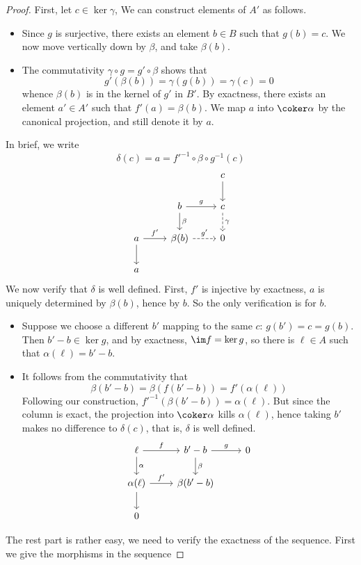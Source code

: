 \begin{proof}
First, let $c\in\ker\gamma$, We can construct elements of $A'$ as follows. 
\begin{itemize}
\item Since $g$ is surjective, there exists an element $b\in B$ such that $g(b)=c$. We now move vertically down by $\beta$, and take $\beta(b)$.
\item The commutativity $\gamma\circ g=g'\circ\beta$ shows that 
\[g'(\beta(b))=\gamma(g(b))=\gamma(c)=0\]
whence $\beta(b)$ is in the kernel of $g'$ in $B'$. By exactness, there exists an element $a'\in A'$ such that $f'(a)=\beta(b)$. We map $a$ into $\coker\alpha$ by the canonical projection, and still denote it by $a$.
\end{itemize}
In brief, we write
\[\delta(c)=a=f'^{-1}\circ\beta\circ g^{-1}(c)\]
\[\begin{tikzcd}
&&c\ar[d]\\
&b\ar[d,"\beta"]\ar[r,"g"]&c\ar[d,dashed,"\gamma"]\\
a\ar[d]\ar[r,"f'"]&\beta(b)\ar[r,dashed,"g'"]&0\\
a&&
\end{tikzcd}\]
\newline
We now verify that $\delta$ is well defined. First, $f'$ is injective by exactness, $a$ is uniquely determined by $\beta(b)$, hence by $b$. So the only verification is for $b$.\par
\begin{itemize}
\item Suppose we choose a different $b'$ mapping to the same $c$: $g(b')=c=g(b)$. Then $b'-b\in\ker g$, and by exactness, $\im f=\ker g$, so there is $\ell\in A$ such that $\alpha(\ell)=b'-b$.
\item It follows from the commutativity that
\[\beta(b'-b)=\beta(f(b'-b))=f'(\alpha(\ell))\]
Following our construction, $f'^{-1}(\beta(b'-b))=\alpha(\ell)$. But since the column is exact, the projection into $\coker\alpha$ kills $\alpha(\ell)$, hence taking $b'$ makes no difference to $\delta(c)$, that is, $\delta$ is well defined.
\[\begin{tikzcd}
\ell\ar[d,"\alpha"]\ar[r,"f"]&b'-b\ar[d,"\beta"]\ar[r,"g"]&0\\
\alpha(\ell)\ar[d]\ar[r,"f'"]&\beta(b'-b)&\\
0&&
\end{tikzcd}\]
\end{itemize}
The rest part is rather easy, we need to verify the exactness of the sequence. First we give the morphisms in the sequence

\end{proof}
